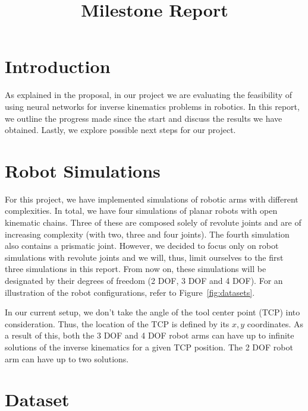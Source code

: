 \documentclass[conference]{IEEEtran}
\begin{document}
\title{Milestone Report}

\author{
    \and
}

\maketitle

\section*{Introduction}

As explained in the proposal, in our project we are evaluating the feasibility of using neural networks for inverse kinematics problems in robotics. In this report, we outline the progress made since the start and discuss the results we have obtained. Lastly, we explore possible next steps for our project.

\section*{Robot Simulations}

For this project, we have implemented simulations of robotic arms with different complexities. In total, we have four simulations of planar robots with open kinematic chains. Three of these are composed solely of revolute joints and are of increasing complexity (with two, three and four joints). The fourth simulation also contains a prismatic joint. However, we decided to focus only on robot simulations with revolute joints and we will, thus, limit ourselves to the first three simulations in this report. From now on, these simulations will be designated by their degrees of freedom (2 DOF, 3 DOF and 4 DOF). For an illustration of the robot configurations, refer to Figure~\ref{fig:datasets}.

In our current setup, we don't take the angle of the tool center point (TCP) into consideration. Thus, the location of the TCP is defined by its $ x, y $ coordinates. As a result of this, both the 3 DOF and 4 DOF robot arms can have up to infinite solutions of the inverse kinematics for a given TCP position. The 2 DOF robot arm can have up to two solutions.

\section*{Dataset}
\end{document}
